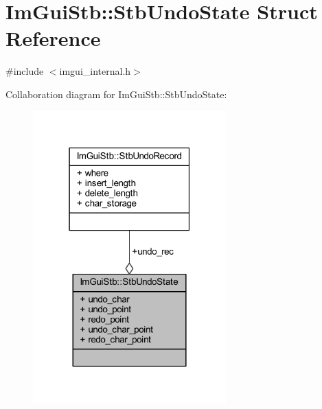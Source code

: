 \hypertarget{struct_im_gui_stb_1_1_stb_undo_state}{}\section{Im\+Gui\+Stb\+:\+:Stb\+Undo\+State Struct Reference}
\label{struct_im_gui_stb_1_1_stb_undo_state}


{\ttfamily \#include $<$imgui\+\_\+internal.\+h$>$}



Collaboration diagram for Im\+Gui\+Stb\+:\+:Stb\+Undo\+State\+:
\nopagebreak
\begin{figure}[H]
\begin{center}
\leavevmode
\includegraphics[width=211pt]{struct_im_gui_stb_1_1_stb_undo_state__coll__graph}
\end{center}
\end{figure}
